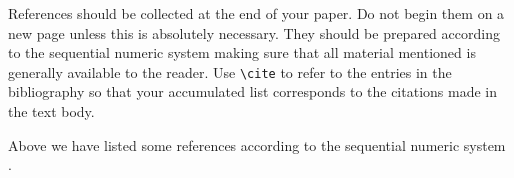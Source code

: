 References should be collected at the end of your paper. Do not begin
them on a new page unless this is absolutely necessary. They should be
prepared according to the sequential numeric system making sure that
all material mentioned is generally available to the reader. Use
\verb+\cite+ to refer to the entries in the bibliography so that your
accumulated list corresponds to the citations made in the text body. 

Above we have listed some references according to the
sequential numeric system \cite{Scho70,Mazu84,Dimi75,Eato75}.




